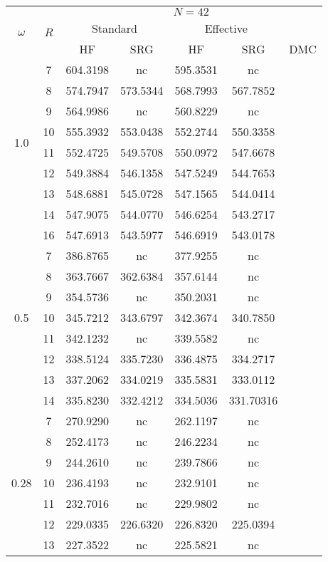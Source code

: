 \begin{table}
\begin{center}
\tabcolsep=0.35cm
\begin{tabular}{|c|c|c|c|c|c|c|}
\hline
\multirow{3}{*}{$\omega$} & \multirow{3}{*}{$R$} & \multicolumn{5}{|c|}{$N=42$} \\
& & \multicolumn{2}{|c|}{Standard} & \multicolumn{2}{|c|}{Effective} &  \\
& & HF & SRG & HF & SRG & DMC \\
\hline\hline
\multirow{8}{*}{1.0} & 7&604.3198 & nc&595.3531 &nc & \multirow{12}{*}{} \\
& 8 &574.7947 &573.5344 &568.7993 & 567.7852 & \\
& 9&564.9986 & nc&560.8229 &nc & \\
& 10 &555.3932 &553.0438 &552.2744 &550.3358  &\\
& 11 &552.4725&549.5708 &550.0972 &547.6678 & \\
& 12 &549.3884 & 546.1358 &547.5249 &544.7653 & \\
& 13 &548.6881 &545.0728 &547.1565 &544.0414 & \\
& 14 &547.9075 &544.0770 &546.6254 &543.2717 & \\
& 16 &547.6913 &543.5977 &546.6919 &543.0178 & \\
\hline
\multirow{7}{*}{0.5} & 7& 386.8765 &nc & 377.9255 &nc & \multirow{12}{*}{} \\
& 8 &363.7667 &362.6384 &357.6144 &nc & \\
&9  &354.5736 &nc &350.2031 &nc & \\
&10 &345.7212 &343.6797 &342.3674 &340.7850 & \\
&11 &342.1232 &nc & 339.5582 & nc& \\
&12 &338.5124 &335.7230 &336.4875 &334.2717 & \\
&13 &337.2062 &334.0219 &335.5831 &333.0112 &\\
&14&335.8230 & 332.4212 &334.5036 &331.70316 & \\
\hline
\multirow{7}{*}{0.28} & 7& 270.9290 &nc &262.1197 &nc & \multirow{12}{*}{} \\
& 8 &252.4173 & nc&246.2234 &nc & \\
& 9 &244.2610 &nc &239.7866 &nc & \\
&10 &236.4193 &nc &232.9101 &nc & \\
&11 &232.7016 &nc& 229.9802& nc & \\
&12 &229.0335 &226.6320 &226.8320 &225.0394 & \\
& 13 &227.3522& nc&225.5821 &nc & \\

\end{tabular}
\end{center}
\end{table}
